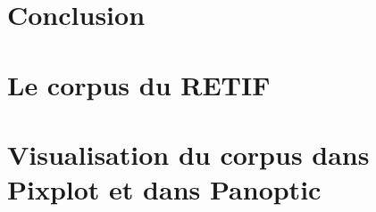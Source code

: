 \documentclass[12pt,twoside]{book}
\begin{document}
	
	\chapter*{Conclusion}
	

\newpage{\pagestyle{empty}\cleardoublepage}
	







\appendix %

\chapter{Le corpus du RETIF}




\chapter[Visualisation du corpus]{Visualisation du corpus dans Pixplot et dans Panoptic}







\newpage{\pagestyle{empty}\cleardoublepage}


\backmatter %

\tableofcontents
\end{document}
